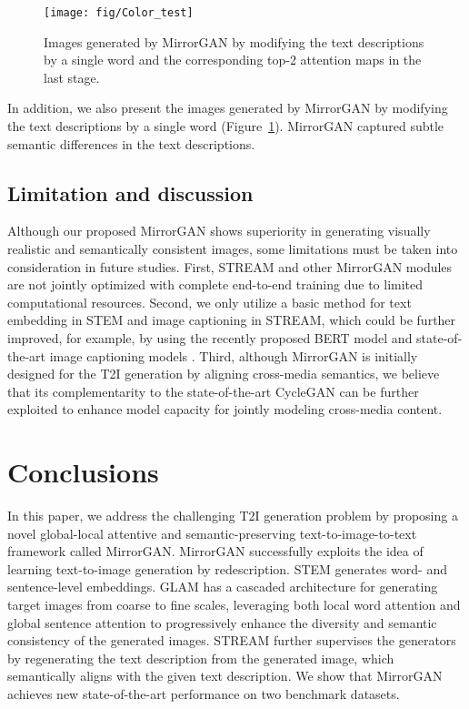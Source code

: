 \documentclass[10pt,twocolumn,letterpaper]{article}
\begin{document}
\begin{figure}[tb!]
\centering
\noindent\texttt{[image: fig/Color\_test]}
\protect\caption{Images generated by MirrorGAN by modifying the text descriptions by a single word and the corresponding top-2 attention maps in the last stage.}
\label{fig:colorVariants}
\end{figure}

In addition, we also present the images generated by MirrorGAN by modifying the text descriptions by a single word (Figure~\ref{fig:colorVariants}). MirrorGAN captured subtle semantic differences in the text descriptions.

\subsection{Limitation and discussion}
Although our proposed MirrorGAN shows superiority in generating visually realistic and semantically consistent images, some limitations must be taken into consideration in future studies. First, STREAM and other MirrorGAN modules are not jointly optimized with complete end-to-end training due to limited computational resources. Second, we only utilize a basic method for text embedding in STEM and image captioning in STREAM, which could be further improved, for example, by using the recently proposed BERT model \cite{devlin2018bert} and state-of-the-art image captioning models \cite{anderson2017bottom, Chen_2018_CVPR}. Third, although MirrorGAN is initially designed for the T2I generation by aligning cross-media semantics, we believe that its complementarity to the state-of-the-art CycleGAN can be further exploited to enhance model capacity for jointly modeling cross-media content.

\section{Conclusions}
In this paper, we address the challenging T2I generation problem by proposing a novel global-local attentive and semantic-preserving text-to-image-to-text framework called MirrorGAN. MirrorGAN successfully exploits the idea of learning text-to-image generation by redescription. STEM generates word- and sentence-level embeddings. GLAM has a cascaded architecture for generating target images from coarse to fine scales, leveraging both local word attention and global sentence attention to progressively enhance the diversity and semantic consistency of the generated images. STREAM further supervises the generators by regenerating the text description from the generated image, which semantically aligns with the given text description. We show that MirrorGAN achieves new state-of-the-art performance on two benchmark datasets.
\end{document}
